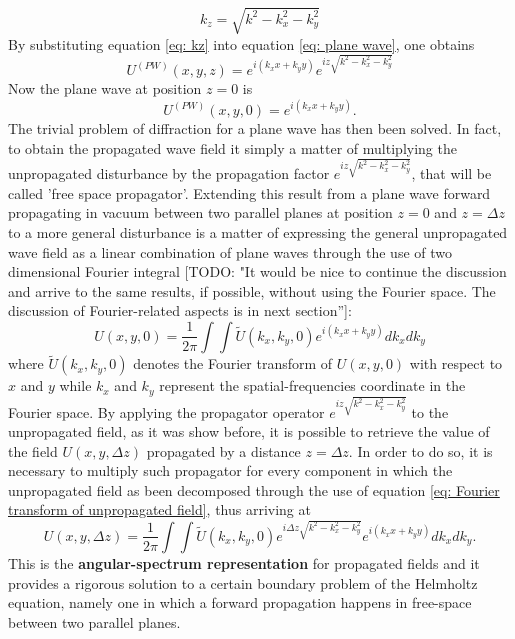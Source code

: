 \documentclass{iucr}              %
\newcommand{\todo}[1]{{\color{red}[TODO: "#1'']}}
\begin{document}
\begin{equation} \label{eq: kz}
k_z = \sqrt{k^2 -k_x^2-k_y^2}
\end{equation}
By substituting equation \ref{eq: kz} into equation \ref{eq: plane wave}, one obtains
\begin{equation}\label{eq: plane wave with no kz}
U^{(PW)}(x,y,z)=e^{i(k_xx+k_yy)}e^{iz\sqrt{k^2 -k_x^2-k_y^2}}
\end{equation}
Now the plane wave at position $z=0$ is 
\begin{equation} \label{eq: plane wave with no kz at z=0}
U^{(PW)}(x,y,0)=e^{i(k_xx+k_yy)}.
\end{equation}
The trivial problem of diffraction for a plane wave has then been solved. In fact, to obtain the propagated wave field it simply a matter of multiplying the unpropagated disturbance by the propagation factor $e^{i z\sqrt{k^2 -k_x^2-k_y^2}}$, that will be called 'free space propagator'. Extending this result from a plane wave forward propagating in vacuum between two parallel planes at position $z=0$ and $z=\Delta z$ to a more general disturbance is a matter of expressing the general unpropagated wave field as a linear combination of plane waves through the use of two dimensional Fourier integral \todo{It would be nice to continue the discussion and arrive to the same results, if possible, without using the Fourier space. The discussion of Fourier-related aspects is in next section}:
\begin{equation}\label{eq: Fourier transform of unpropagated field}
U(x, y, 0) = \frac {1}{ 2 \pi}\int \int \widetilde{U}(k_x, k_y, 0)e^{i(k_x x + k_y y)} dk_x dk_y
\end{equation} 
where $\widetilde{U}(k_x, k_y, 0)$ denotes the Fourier transform of $U(x,y,0)$ with respect to $x$ and $y$ while $k_x$ and $k_y$ represent the spatial-frequencies coordinate in the Fourier space. By applying the propagator operator $e^{i z\sqrt{k^2 -k_x^2-k_y^2}}$ to the unpropagated field, as it was show before, it is possible to retrieve the value of the field $U(x,y,\Delta z)$ propagated by a distance $z=\Delta z$. In order to do so, it is necessary to multiply such propagator for every component in which the unpropagated field as been decomposed through the use of equation \ref{eq: Fourier transform of unpropagated field}, thus arriving at
\begin{equation}\label{eq: angular-spectrum representation}
U(x, y, \Delta z) = \frac {1}{ 2 \pi}\int \int \widetilde{U}(k_x, k_y, 0)e^{i\Delta z\sqrt{k^2 -k_x^2-k_y^2}}e^{i(k_x x + k_y y)} dk_x dk_y.
\end{equation} 
This is the \textbf{angular-spectrum representation} for propagated fields and it provides a rigorous solution to a certain boundary problem of the Helmholtz equation, namely one in which a forward propagation happens in free-space between two parallel planes. 
\end{document}
